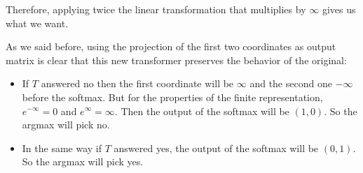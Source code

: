 Therefore, applying twice the linear transformation that multiplies by $\infty$ gives us what we want.

As we said before, using the projection of the first two coordinates as output matrix is clear that this new transformer preserves the behavior of the original:

\begin{itemize}
    \item If $T$ answered no then the first coordinate will be $\infty$ and the second one $-\infty$ before the softmax. But for the properties of the finite representation, $e^{-\infty} = 0$ and $e^{\infty} = \infty$. Then the output of the softmax will be $(1,0)$. So the argmax will pick no.
    \item In the same way if $T$ answered yes, the output of the softmax will be $(0,1)$. So the argmax  will pick yes.
\end{itemize}

